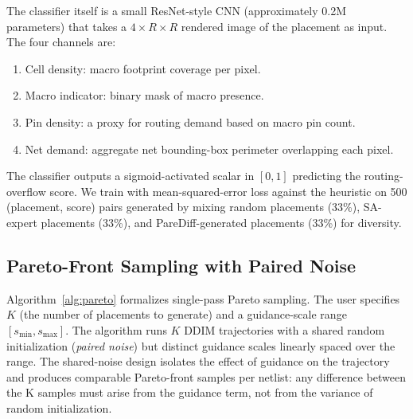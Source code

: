 \documentclass[lettersize,journal]{IEEEtran}
\begin{document}
The classifier itself is a small ResNet-style CNN (approximately 0.2M parameters) that takes a $4 \times R \times R$ rendered image of the placement as input. The four channels are:
\begin{enumerate}
\item Cell density: macro footprint coverage per pixel.
\item Macro indicator: binary mask of macro presence.
\item Pin density: a proxy for routing demand based on macro pin count.
\item Net demand: aggregate net bounding-box perimeter overlapping each pixel.
\end{enumerate}
The classifier outputs a sigmoid-activated scalar in $[0, 1]$ predicting the routing-overflow score. We train with mean-squared-error loss against the heuristic on 500 (placement, score) pairs generated by mixing random placements (33\%), SA-expert placements (33\%), and PareDiff-generated placements (33\%) for diversity.

\subsection{Pareto-Front Sampling with Paired Noise}

Algorithm~\ref{alg:pareto} formalizes single-pass Pareto sampling. The user specifies $K$ (the number of placements to generate) and a guidance-scale range $[s_\text{min}, s_\text{max}]$. The algorithm runs $K$ DDIM trajectories with a shared random initialization (\emph{paired noise}) but distinct guidance scales linearly spaced over the range. The shared-noise design isolates the effect of guidance on the trajectory and produces comparable Pareto-front samples per netlist: any difference between the K samples must arise from the guidance term, not from the variance of random initialization.
\end{document}
